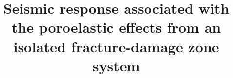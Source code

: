 \documentclass[draft]{agujournal2019}
\begin{document}
%
%

\title{Seismic response associated with the poroelastic effects from an isolated fracture-damage zone system}


%
%










\end{document}
